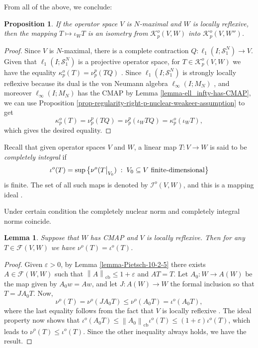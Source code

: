 \documentclass[11pt]{amsart}
\DeclareMathOperator{\cb}{cb}
\newcommand{\n}[1]{ \left\|#1\right\| }
\newcommand\restr[2]{{%
  \left.\kern-\nulldelimiterspace %
  #1 %
  \vphantom{\big|} %
  \right|_{#2} %
  }}
\newtheorem{lemma}[theorem]{Lemma}
\newtheorem{proposition}[theorem]{Proposition}
\numberwithin{equation}{section}
\begin{document}
From all of the above, we conclude:


\begin{proposition}
If the operator space $V$ is $N$-maximal and $W$ is locally reflexive, then the mapping $T \mapsto \iota_W T$ is an isometry from 
$\mathcal{K}_p^o(V,W)$ into $\mathcal{K}_p^o(V,W'')$.
\end{proposition}


\begin{proof}
 Since $V$ is $N$-maximal, there is a complete contraction $Q : \ell_1(I;\mathcal{S}_1^N) \to V$. Given that $\ell_1(I;\mathcal{S}_1^N)$ is a projective operator space, for  $T \in \mathcal{K}_p^o(V,W)$  we have the equality $\kappa_p^o(T)=\nu^p_p(TQ)$ \cite[Prop. 3.8.]{ChaDiGa-Operator-p-compact}. Since $\ell_1(I;\mathcal{S}_1^N)$ is strongly locally reflexive because its dual is the von Neumann algebra $\ell_\infty(I;M_N)$ \cite[Thm. 15.3.5]{Effros-Ruan-book}, and moreover $\ell_\infty(I;M_N)$ has the CMAP by Lemma \ref{lemma-ell_infty-has-CMAP}, we can use Proposition \ref{prop-regularity-right-p-nuclear-weakeer-assumption} to get
 $$\kappa_p^o(T)=\nu^p_p(TQ)=\nu^p_p(\iota_W TQ)=\kappa_p^o(\iota_WT),$$
 which gives the desired equality.
\end{proof}


Recall that given operator spaces $V$ and $W$, a linear map $T : V \to W$ is said to be \emph{completely integral} if
\[
\iota^o(T) = \sup\big\{ \nu^o(\restr{T}{V_0}) \;:\; V_0 \subseteq V \text{ finite-dimensional} \big\}
\]
is finite. The set of all such maps is denoted by $\mathcal{I}^o(V,W)$, and this is a mapping ideal \cite[Sec. 12.3]{Effros-Ruan-book}.


Under certain condition the completely nuclear norm and completely integral norms coincide. 

\begin{lemma}\label{lemma-nuclear-coincides-integral}
Suppose that $W$ has CMAP and $V$ is  locally reflexive.
Then for any $T \in \mathcal{F}(V,W)$ we have $\nu^o(T) = \iota^o(T)$.
\end{lemma}

\begin{proof}
Given $\varepsilon>0$, by Lemma \ref{lemma-Pietsch-10-2-5} there exists $A\in\mathcal F(W,W)$ such that $\n{A}_{\cb} \le 1+\varepsilon$ and $AT=T$.
Let $A_0:W \to A(W)$ be the map given by $A_0w=Aw$, and let $J:A(W) \to W$ the formal inclusion so that $T=JA_0T$.
Now,
$$\nu^o(T)=\nu^o(JA_0T)\leq\nu^o(A_0T) = \iota^o(A_0T), $$
where the last equality follows from the fact that $V$ is locally reflexive \cite[Thm. 14.3.1]{Effros-Ruan-book}. The ideal property now shows that $\iota^o(A_0T) \leq \n{A_0}_{\cb} \iota^o(T) \le (1+\varepsilon)\iota^o(T)$,
which leads to $\nu^o(T) \leq \iota^o(T)$. Since the other inequality always holds, we have the result.
\end{proof}
\end{document}
